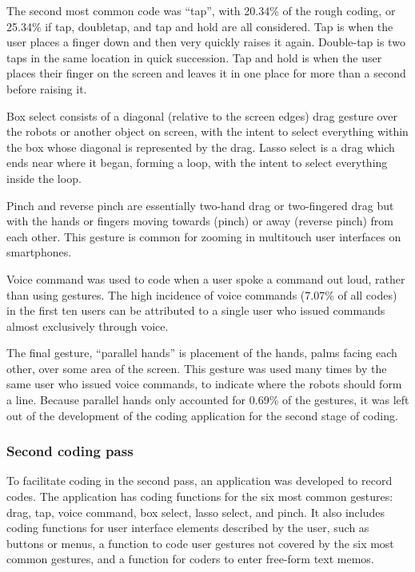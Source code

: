 The second most common code was ``tap'', with 20.34\% of the rough coding, or 25.34\% if tap, doubletap, and tap and hold are all considered. Tap is when the user places a finger down and then very quickly raises it again. Double-tap is two taps in the same location in quick succession. Tap and hold is when the user places their finger on the screen and leaves it in one place for more than a second before raising it. 

Box select consists of a diagonal (relative to the screen edges) drag gesture over the robots or another object on screen, with the intent to select everything within the box whose diagonal is represented by the drag. 
Lasso select is a drag which ends near where it began, forming a loop, with the intent to select everything inside the loop. 

Pinch and reverse pinch are essentially two-hand drag or two-fingered drag but with the hands or fingers moving towards (pinch) or away (reverse pinch) from each other.
This gesture is common for zooming in multitouch user interfaces on smartphones. 

Voice command was used to code when a user spoke a command out loud, rather than using gestures. The high incidence of voice commands (7.07\% of all codes) in the first ten users can be attributed to a single user who issued commands almost exclusively through voice. 

The final gesture, ``parallel hands'' is placement of the hands, palms facing each other, over some area of the screen. This gesture was used many times by the same user who issued voice commands, to indicate where the robots should form a line. Because parallel hands only accounted for 0.69\% of the gestures, it was left out of the development of the coding application for the second stage of coding. 


 
\subsubsection{Second coding pass}

To facilitate coding in the second pass, an application was developed to record codes. 
The application has coding functions for the six most common gestures: drag, tap, voice command, box select, lasso select, and pinch. 
It also includes coding functions for user interface elements described by the user, such as buttons or menus, a function to code user gestures not covered by the six most common gestures, and a function for coders to enter free-form text memos. 

